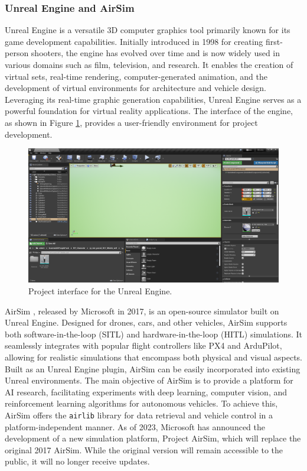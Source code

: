 \subsubsection{Unreal Engine and AirSim}
\label{subsec:unreal}

Unreal Engine \cite{unreal-front} is a versatile 3D computer graphics tool primarily known for its game development capabilities. Initially introduced in 1998 for creating first-person shooters, the engine has evolved over time and is now widely used in various domains such as film, television, and research. It enables the creation of virtual sets, real-time rendering, computer-generated animation, and the development of virtual environments for architecture and vehicle design. Leveraging its real-time graphic generation capabilities, Unreal Engine serves as a powerful foundation for virtual reality applications. The interface of the engine, as shown in Figure \ref{fig:ue-interface}, provides a user-friendly environment for project development.

\begin{figure}
  \centering
  \includegraphics[width=\textwidth,keepaspectratio]{img/ue-interface.png}
  \caption{Project interface for the Unreal Engine.}\label{fig:ue-interface}
\end{figure}


AirSim \cite{airsim-front}, released by Microsoft in 2017, is an open-source simulator built on Unreal Engine. Designed for drones, cars, and other vehicles, AirSim supports both software-in-the-loop (SITL) and hardware-in-the-loop (HITL) simulations. It seamlessly integrates with popular flight controllers like PX4 and ArduPilot, allowing for realistic simulations that encompass both physical and visual aspects. Built as an Unreal Engine plugin, AirSim can be easily incorporated into existing Unreal environments. The main objective of AirSim is to provide a platform for AI research, facilitating experiments with deep learning, computer vision, and reinforcement learning algorithms for autonomous vehicles. To achieve this, AirSim offers the \texttt{airlib} library for data retrieval and vehicle control in a platform-independent manner. As of 2023, Microsoft has announced the development of a new simulation platform, Project AirSim, which will replace the original 2017 AirSim. While the original version will remain accessible to the public, it will no longer receive updates.

